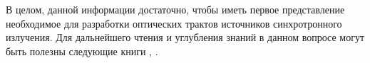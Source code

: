 В целом, данной информации достаточно, чтобы иметь первое представление необходимое для разработки оптических трактов источников синхротронного излучения. Для дальнейшего чтения и углубления знаний в данном вопросе могут быть полезны следующие книги \cite{als2011elements}, \cite{authier2006dynamical}.


